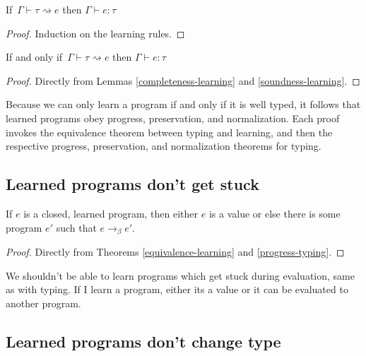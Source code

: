 \begin{lemma}
If $\,\Gamma \vdash \tau \rightsquigarrow e$ then $\Gamma \vdash e : \tau$
\label{soundness-learning}
\end{lemma}
\begin{proof}
Induction on the learning rules.
\end{proof}
\vspace*{-1.2em}

\begin{theorem}
If and only if $\,\Gamma \vdash \tau \rightsquigarrow e$ then $\Gamma \vdash e : \tau$
\label{equivalence-learning}
\end{theorem}
\begin{proof}
Directly from Lemmas \ref{completeness-learning} and \ref{soundness-learning}.
\end{proof}
\vspace*{-1.2em}

Because we can only learn a program if and only if it is well typed, it follows that learned programs obey progress, preservation, and normalization. Each proof invokes the equivalence theorem between typing and learning, and then the respective progress, preservation, and normalization theorems for typing.

\subsection{Learned programs don't get stuck}

\begin{corollary}
If $e$ is a closed, learned program, then either $e$ is a value or else there is some program $e'$ such that $e \to_\beta e'$.
\label{progress-learning}
\end{corollary}
\begin{proof}
Directly from Theorems \ref{equivalence-learning} and \ref{progress-typing}.
\end{proof}
\vspace*{-1.2em}

We shouldn't be able to learn programs which get stuck during evaluation, same as with typing. If I learn a program, either its a value or it can be evaluated to another program. 

\subsection{Learned programs don't change type}

